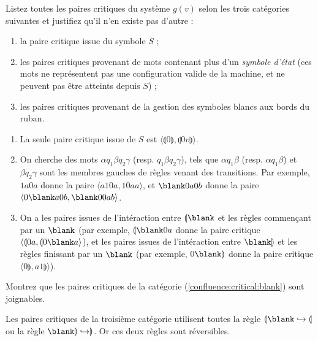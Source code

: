 \begin{exercice}
  \ifcorrection{\newpage}
  \begin{question}
  \item Listez toutes les paires critiques du système $g(v)$ selon les trois catégories suivantes
    et justifiez qu'il n'en existe pas d'autre :
    \begin{enumerate}
    \item\label{confluence:critical:S} la paire critique issue du symbole $S$ ;
    \item\label{confluence:critical:invalid} les paires critiques provenant de mots contenant plus d'un \emph{symbole d'état}
      (ces mots ne représentent pas une configuration valide de la machine, et ne peuvent pas être atteints depuis $S$) ;
    \item\label{confluence:critical:blank} les paires critiques provenant de la gestion des symboles blancs aux bords du ruban.
    \end{enumerate}
  \end{question}
  \begin{correction}
    \begin{enumerate}
    \item La seule paire critique issue de $S$ est $\langle \llparenthesis 0 \rrparenthesis, \llparenthesis 0 v \rrparenthesis  \rangle$.
    \item On cherche des mots $\alpha q_1 \beta q_2 \gamma$ (resp. $q_1 \beta q_2 \gamma$), tels que $\alpha q_1 \beta$ (resp. $\alpha q_1 \beta$)
      et $\beta q_2 \gamma$ sont les membres gauches de règles venant des transitions. Par exemple, $1a0a$ donne la paire $\langle a10a, 10aa  \rangle$,
      et $\blank 0 a 0 b$ donne la paire $\langle 0 \blank a 0 b, \blank 0 0 a b \rangle$.
    \item On a les paires issues de l'intéraction entre $\llparenthesis\blank$ et les règles commençant par un $\blank$
      (par exemple, $\llparenthesis\blank 0 a$ donne la paire critique $\langle \llparenthesis 0 a, \llparenthesis 0 \blank a\rangle$),
      et les paires issues de l'intéraction entre $\blank \rrparenthesis$ et les règles finissant par un $\blank$
      (par exemple, $0 \blank \rrparenthesis$ donne la paire critique $\langle 0 \rrparenthesis, a1 \rrparenthesis\rangle$).
    \end{enumerate}
  \end{correction}
  
  \begin{question}
  \item Montrez que les paires critiques de la catégorie (\ref{confluence:critical:blank}) sont joignables.
  \end{question}
  \begin{correction}
    Les paires critiques de la troisième catégorie utilisent toutes la règle $\llparenthesis \blank \hookrightarrow \llparenthesis$
    ou la règle $\blank\rrparenthesis \hookrightarrow \rrparenthesis$. Or ces deux règles sont réversibles. 
  \end{correction}


\end{exercice}
